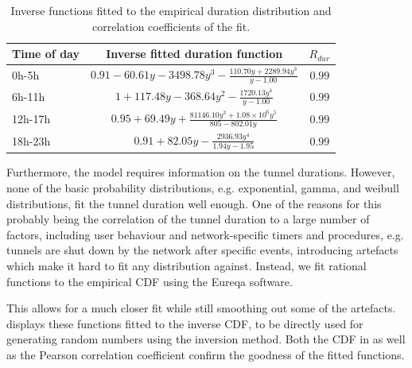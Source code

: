 \begin{table}
  \centering
  \caption{Inverse functions fitted to the empirical duration distribution and correlation coefficients of the fit.}
  \label{tab:cloud:virtualized_network_functions:measurement_data:evaluation:duration_fits}  
  \begin{tabular}{lcc}
  \toprule
  Time of day & Inverse fitted duration function & \(R_{dur}\)\\
  \midrule
  0h-5h & $0.91 - 60.61y - 3498.78y^3 - \frac{110.70y + 2289.94y^3}{y - 1.00}$ &  $0.99$ \\
  6h-11h & $1 + 117.48y - 368.64y^2 - \frac{1720.13y^4}{y - 1.00}$ & $0.99$ \\
  12h-17h & $0.95 + 69.49y + \frac{81146.10y^3 + 1.08\times10^6y^5}{805 - 802.01y}$ & $0.99$ \\
  18h-23h & $0.91 + 82.05y - \frac{2936.93y^4}{1.94y - 1.95}$ & $0.99$\\
  \bottomrule
  \end{tabular}
\end{table}

Furthermore, the model requires information on the tunnel durations.
However, none of the basic probability distributions, e.g. exponential, gamma, and weibull distributions, fit the tunnel duration well enough.
One of the reasons for this probably being the correlation of the tunnel duration to a large number of factors, including user behaviour and network-specific timers and procedures, e.g. tunnels are shut down by the network after specific events, introducing artefacts which make it hard to fit any distribution against.
Instead, we fit rational functions to the empirical \gls{CDF} using the Eureqa \cite{Schmidt2009} software.

This allows for a much closer fit while still smoothing out some of the artefacts.
 displays these functions fitted to the inverse \gls{CDF}, to be directly used for generating random numbers using the inversion method.
Both the \gls{CDF} in  as well as the Pearson correlation coefficient confirm the goodness of the fitted functions.
